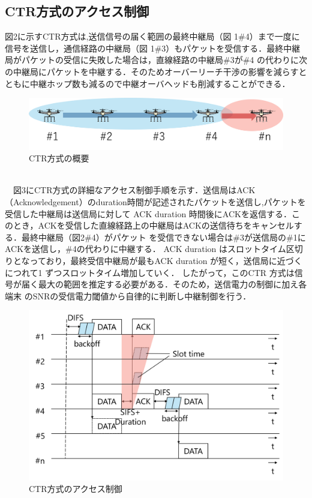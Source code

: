 \documentclass[a4paper,10pt]{ltjsarticle}
\begin{document}
\subsection{CTR方式のアクセス制御}
図2に示すCTR方式は,送信信号の届く範囲の最終中継局（図 1\#4）まで一度に信号を送信し，通信経路の中継局（図 1\#3）もパケットを受信する．最終中継局がパケットの受信に失敗した場合は，直線経路の中継局\#3が\#4 の代わりに次の中継局にパケットを中継する．そのためオーバーリーチ干渉の影響を減らすとともに中継ホップ数も減るので中継オーバヘッドも削減することができる．
\begin{figure}[htbp]
  \centering
  \includegraphics[width=\linewidth]{CTR_topology.png} %
  \caption{CTR方式の概要}
  \label{fig:CTR方式のトポロジー} %
\end{figure}
\\　図3にCTR方式の詳細なアクセス制御手順を示す．送信局はACK（Acknowledgement）のduration時間が記述されたパケットを送信し,パケットを受信した中継局は送信局に対して ACK duration 時間後にACKを返信する．このとき，ACKを受信した直線経路上の中継局はACKの送信待ちをキャンセルする．最終中継局（図2\#4）がパケット を受信できない場合は\#3が送信局の\#1に ACKを送信し，\#4の代わりに中継する．
ACK duration はスロットタイム区切りとなっており，最終受信中継局が最もACK duration が短く，送信局に近づくにつれて1 ずつスロットタイム増加していく．
したがって，このCTR 方式は信号が届く最大の範囲を推定する必要がある．そのため，送信電力の制御に加え各端末
のSNRの受信電力閾値から自律的に判断し中継制御を行う．
\begin{figure}[H]
  \centering
  \includegraphics[width=\linewidth]{CTR_accsess.png} %
  \caption{CTR方式のアクセス制御}
  \label{fig:CTR方式のアクセス制御} %
\end{figure}
\end{document}
